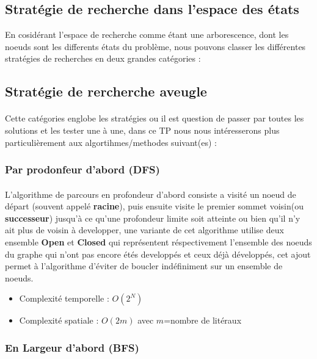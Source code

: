 \subsection{Stratégie de recherche dans l'espace des états}
En cosidérant l'espace de recherche comme étant une arborescence, dont les noeuds sont les differents états du problème, nous pouvons classer les différentes stratégies de recherches en deux grandes catégories :
\subsection{Stratégie de rercherche aveugle}
\paragraph{}Cette catégories englobe les stratégies ou il est question de passer par toutes les solutions et les tester une à une, dans ce TP nous nous intéresserons plus particulièrement aux algortihmes/methodes suivant(es) :  
\subsubsection{Par prodonfeur d'abord (DFS)}\label{DFSdef}
\paragraph{}
L'algorithme de parcours en profondeur d'abord consiste a visité un noeud de départ (souvent appelé \textbf{racine}), puis ensuite visite le premier sommet voisin(ou \textbf{successeur}) jusqu'à ce qu'une profondeur limite soit atteinte ou bien qu'il n'y ait plus de voisin à developper, une variante de cet algorithme utilise deux ensemble \textbf{Open} et \textbf{Closed} qui représentent réspectivement l'ensemble des noeuds du graphe qui n'ont pas encore étés developpés et ceux déjà développés, cet ajout permet à l'algorithme d'éviter de boucler indéfiniment sur un ensemble de noeuds.
\begin{itemize}
	\item Complexité temporelle : $O(2^{N})$
	\item Complexité spatiale : $O(2m)$ avec $m$=nombre de litéraux 
\end{itemize}
\subsubsection{En Largeur d'abord (BFS)}\label{BFSdef}
